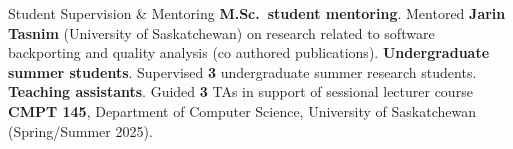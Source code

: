 \begin{rubric}{Student Supervision \& Mentoring}
\entry*[M.Sc.]%
	\textbf{M.Sc.\ student mentoring}. Mentored \textbf{Jarin Tasnim} (University of Saskatchewan) on research related to software backporting and quality analysis (co authored publications).
\vspace{-1mm}
\entry*[UG]%
	\textbf{Undergraduate summer students}. Supervised \textbf{3} undergraduate summer research students.
\vspace{-1mm}
\entry*[TAs]%
	\textbf{Teaching assistants}. Guided \textbf{3} TAs in support of sessional lecturer course \textbf{CMPT 145}, Department of Computer Science, University of Saskatchewan (Spring/Summer 2025).
\end{rubric}
